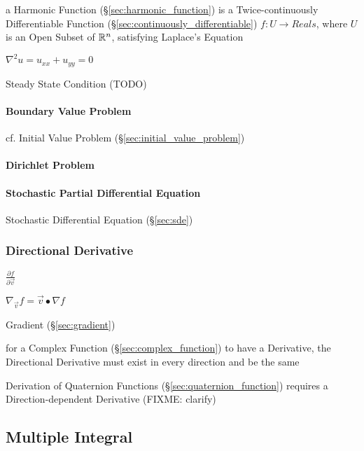 a Harmonic Function (\S\ref{sec:harmonic_function}) is a Twice-continuously
Differentiable Function (\S\ref{sec:continuously_differentiable}) $f : U
\rightarrow Reals$, where $U$ is an Open Subset of $\mathbb{R}^n$, satisfying
Laplace's Equation

$\nabla^2 u = u_{xx} + u_{yy} = 0$ %

Steady State Condition (TODO)



\paragraph{Boundary Value Problem}\label{sec:boundary_value_problem}\hfill

\fist cf. Initial Value Problem (\S\ref{sec:initial_value_problem})



\paragraph{Dirichlet Problem}\label{sec:dirichlet_problem}\hfill

\paragraph{Stochastic Partial Differential Equation}\label{sec:spde}\hfill

\fist Stochastic Differential Equation (\S\ref{sec:sde})



\subsubsection{Directional Derivative}\label{sec:directional_derivative}

$\frac{\partial{f}}{\partial{\vec{v}}}$

$\nabla_{\vec{v}} f = \vec{v}\bullet \nabla{f}$

Gradient (\S\ref{sec:gradient})

for a Complex Function (\S\ref{sec:complex_function}) to have a Derivative, the
Directional Derivative must exist in every direction and be the same

Derivation of Quaternion Functions (\S\ref{sec:quaternion_function}) requires a
Direction-dependent Derivative (FIXME: clarify)



\subsection{Multiple Integral}\label{sec:multiple_integral}

